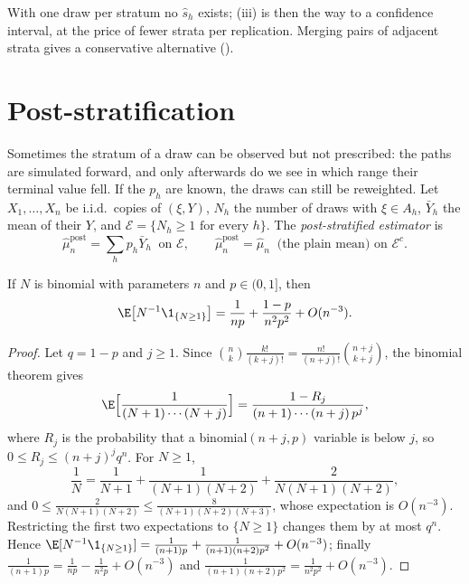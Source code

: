 With one draw per stratum no $\hat s_h$ exists; (iii) is then the way to a confidence
interval, at the price of fewer strata per replication. Merging pairs of adjacent strata
gives a conservative alternative ().


\section{Post-stratification}\label{sec:st-post}

Sometimes the stratum of a draw can be observed but not prescribed: the paths are simulated
forward, and only afterwards do we see in which range their terminal value fell. If the
$p_h$ are known, the draws can still be reweighted. Let $X_1,\dots,X_n$ be i.i.d.\ copies of
$(\xi,Y)$, $N_h$ the number of draws with $\xi\in A_h$, $\bar Y_h$ the mean of their $Y$, and
$\mathcal E=\{N_h\ge1\text{ for every }h\}$. The \emph{post-stratified estimator} is
\[
  \hat\mu^{\mathrm{post}}_n=\sum_hp_h\bar Y_h\ \text{ on }\mathcal E,\qquad
  \hat\mu^{\mathrm{post}}_n=\hat\mu_n\ \text{ (the plain mean) on }\mathcal E^c .
\]

\begin{lemma}\label{lem:st-binomial}
If $N$ is binomial with parameters $n$ and $p\in(0,1]$, then
\[
  \E\big[N^{-1}\1_{\{N\ge1\}}\big]=\frac1{np}+\frac{1-p}{n^2p^2}+O(n^{-3}).
\]
\end{lemma}

\begin{proof}
Let $q=1-p$ and $j\ge1$. Since $\binom nk\frac{k!}{(k+j)!}=\frac{n!}{(n+j)!}\binom{n+j}{k+j}$,
the binomial theorem gives
\[
  \E\Big[\frac{1}{(N+1)\cdots(N+j)}\Big]=\frac{1-R_j}{(n+1)\cdots(n+j)\,p^j},
\]
where $R_j$ is the probability that a binomial$(n+j,p)$ variable is below $j$, so
$0\le R_j\le(n+j)^jq^{n}$. For $N\ge1$,
\[
  \frac1N=\frac1{N+1}+\frac1{(N+1)(N+2)}+\frac2{N(N+1)(N+2)},
\]
and $0\le\frac2{N(N+1)(N+2)}\le\frac8{(N+1)(N+2)(N+3)}$, whose expectation is $O(n^{-3})$.
Restricting the first two expectations to $\{N\ge1\}$ changes them by at most $q^n$. Hence
$\E[N^{-1}\1_{\{N\ge1\}}]=\frac1{(n+1)p}+\frac1{(n+1)(n+2)p^2}+O(n^{-3})$; finally
$\frac1{(n+1)p}=\frac1{np}-\frac1{n^2p}+O(n^{-3})$ and
$\frac1{(n+1)(n+2)p^2}=\frac1{n^2p^2}+O(n^{-3})$.
\end{proof}

